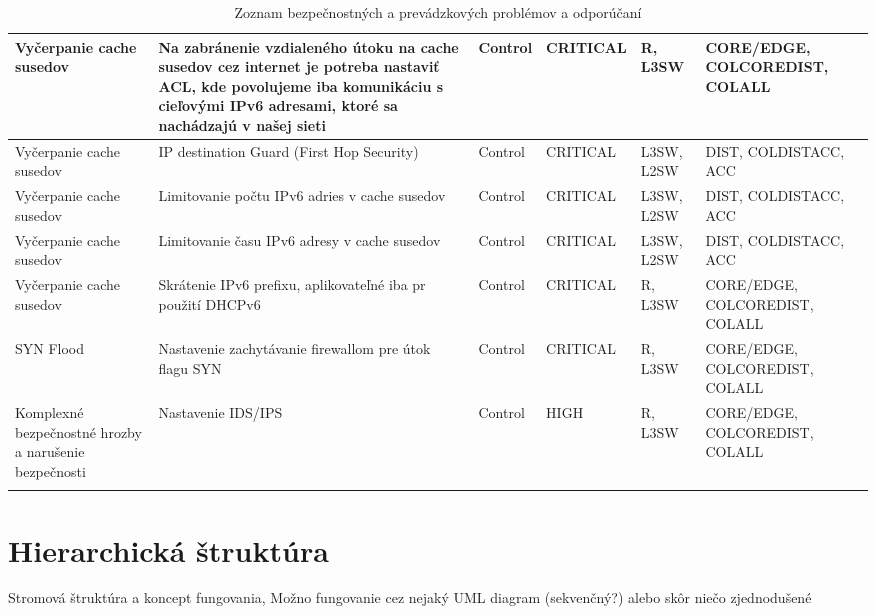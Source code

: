 \begin{longtable}{|P{8em}|P{9em}|P{8em}|P{5em}|P{5em}|P{10em}|}
    Vyčerpanie cache susedov & Na zabránenie vzdialeného útoku na cache susedov cez internet je potreba nastaviť ACL, kde povolujeme iba komunikáciu s cieľovými IPv6 adresami, ktoré sa nachádzajú v našej sieti & Control & CRITICAL & R, L3SW & CORE/EDGE, COLCOREDIST, \hbox{COLALL} \\ \hline
    Vyčerpanie cache susedov & IP destination Guard (First Hop Security) & Control & CRITICAL & L3SW, L2SW & DIST, COLDISTACC, ACC \\ \hline
    Vyčerpanie cache susedov & Limitovanie počtu IPv6 adries v cache susedov & Control & CRITICAL & L3SW, L2SW & DIST, COLDISTACC, ACC \\ \hline
    Vyčerpanie cache susedov & Limitovanie času IPv6 adresy v cache susedov & Control & CRITICAL & L3SW, L2SW & DIST, COLDISTACC, ACC \\ \hline
    Vyčerpanie cache susedov & Skrátenie IPv6 prefixu, aplikovateľné iba pr použití DHCPv6 & Control & CRITICAL & R, L3SW & CORE/EDGE, COLCOREDIST, \hbox{COLALL} \\ \hline
    SYN Flood & Nastavenie zachytávanie firewallom pre útok flagu SYN & Control & CRITICAL & R, L3SW & CORE/EDGE, COLCOREDIST, \hbox{COLALL} \\ \hline
    Komplexné bezpečnostné hrozby a narušenie bezpečnosti & Nastavenie IDS/IPS & Control & HIGH & R, L3SW & CORE/EDGE, COLCOREDIST, \hbox{COLALL} \\ \hline
		
	\caption{Zoznam bezpečnostných a prevádzkových problémov a odporúčaní}
	\label{checklist}\\
\end{longtable}

 
\section{Hierarchická štruktúra}
Stromová štruktúra a koncept fungovania, Možno fungovanie cez nejaký UML diagram (sekvenčný?) alebo skôr niečo zjednodušené



